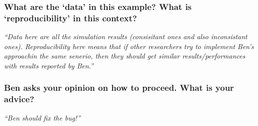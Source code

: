 \documentclass[12pt]{beamer}
\newcommand\ans[1]{{\it ``#1''}}
\newcommand\gap{\vspace{5mm}}
\begin{document}
\begin{frame} %
  \frametitle{ What are the `data' in this example? What is `reproducibility' in this context?}

  \ans{Data here are all the simulation results (consisitant ones and also inconsistant ones). Reproducibility here means that if other researchers try to implement Ben’s approachin  the  same  senerio,  then  they  should  get  similar  results/performances  with  results reported by Ben.}
    




\end{frame}

\begin{frame} %
  \frametitle{ Ben asks your opinion on how to proceed. What is your advice?}






  \gap
  
\ans{Ben should fix the bug!}


\end{frame}
\end{document}
